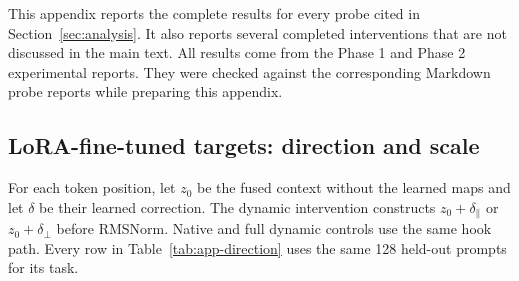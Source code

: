 This appendix reports the complete results for every probe cited in Section~\ref{sec:analysis}. It also reports several completed interventions that are not discussed in the main text. All results come from the Phase 1 and Phase 2 experimental reports. They were checked against the corresponding Markdown probe reports while preparing this appendix.

\subsection{LoRA-fine-tuned targets: direction and scale}
\label{app:lora-direction}

For each token position, let $z_0$ be the fused context without the learned maps and let $\delta$ be their learned correction. The dynamic intervention constructs $z_0+\delta_{\parallel}$ or $z_0+\delta_{\perp}$ before RMSNorm. Native and full dynamic controls use the same hook path. Every row in Table~\ref{tab:app-direction} uses the same 128 held-out prompts for its task.

\begin{table}[htbp]
\centering
\caption{Complete direction intervention results. Mean throughput is measured in tokens/s. Summed time is measured in seconds over 128 prompts. Gain and retained latency reduction are percentages relative to the matching dynamic controls.}
\label{tab:app-direction}
\small
{}
\end{table}

